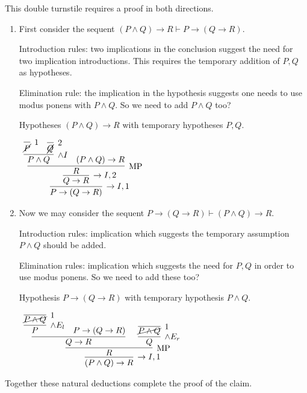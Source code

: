 \documentclass[11pt]{report}
\begin{document}
\begin{enumerate}
\begin{enumerate}
		This double turnstile requires a proof in both directions. 
		
		\begin{enumerate}
		\item First consider the sequent $(P \land Q) \to R \vdash P \to (Q \to R)$.
		
		\vspace{0.2cm}

		Introduction rules: two implications in the conclusion suggest the need for two implication introductions. This requires the temporary addition of $P,Q$ as hypotheses. 

		\vspace{0.2cm}

		Elimination rule: the implication in the hypothesis suggests one needs to use modus ponens with $P \land Q$. So we need to add $P \land Q$ too?

		\vspace{0.3cm}
		Hypotheses $(P \land Q) \to R$ with temporary hypotheses $P,Q$.

		\begin{mdframed}
			\begin{center}
				$\begin{array}{c}
					\infer[\to I,1]{P \to (Q \to R)}
						{\infer[\to I,2]{Q \to R}
							{\infer[\MP]{R}
								{\infer[\land I]{P \land Q}
									{\infer[1]{\cancel{P}}{} & \infer[2]{\cancel{Q}}{}}
								&							
								(P \land Q) \to R}}}
				\end{array}$
			\end{center}
		\end{mdframed}

		\item Now we may consider the sequent $P \to (Q \to R) \vdash (P \land Q) \to R$.

		\vspace{0.2cm}

		Introduction rules: implication which suggests the temporary assumption $P\land Q$ should be added. 		
		
		\vspace{0.2cm}

		Elimination rules: implication which suggests the need for $P,Q$ in order to use modus ponens. So we need to add these too? 

		\vspace{0.3cm}
		Hypothesis $P \to (Q \to R)$ with temporary hypothesis $P \land Q$.
		\begin{mdframed}
			\begin{center}
				$\begin{array}{c}
					\infer[\to I,1]{(P \land Q) \to R}
						{\infer[\MP]{R}
							{\infer[]{Q\to R}
								{\infer[\land E_{l}]{P}{\infer[1]{\cancel{P \land Q}}{}} & P \to (Q \to R)}
							&
							\infer[\land E_{r}]{Q}
								{\infer[1]{\cancel{P \land Q}}{}}}}
				\end{array}$
			\end{center}
		\end{mdframed}
	\end{enumerate}
	Together these natural deductions complete the proof of the claim. 
		

\end{enumerate}
\end{enumerate}
\end{document}
